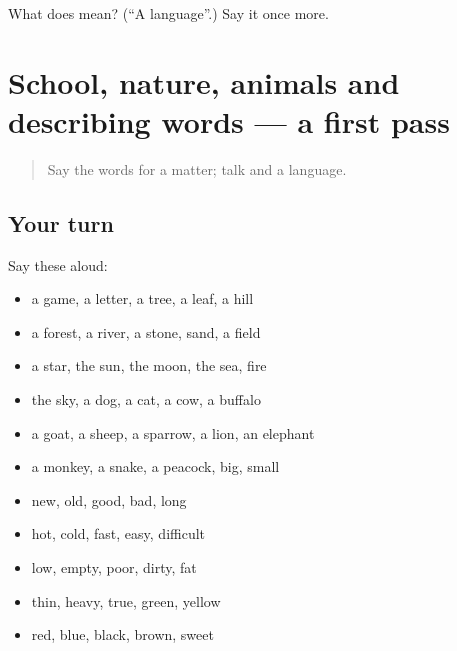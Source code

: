 \begin{tcolorbox}[breakable,colback=teal!4,colframe=teal!35!black,title={Before you move on}]
What does  mean? (\textquotedblleft{}A language\textquotedblright{}.) Say it once more.
\end{tcolorbox}
\section[(dialogue)]{School, nature, animals and describing words — a first pass}

\label{lesson:MW-R89-first-pass-school-nature-animals-and-describing-wor}



\begin{quote}
Say the words for a matter; talk and a language.
\end{quote}

\subsection*{Your turn}
Say these aloud:

\begin{itemize}
\raggedright
  \item a game, a letter, a tree, a leaf, a hill
  \item a forest, a river, a stone, sand, a field
  \item a star, the sun, the moon, the sea, fire
  \item the sky, a dog, a cat, a cow, a buffalo
  \item a goat, a sheep, a sparrow, a lion, an elephant
  \item a monkey, a snake, a peacock, big, small
  \item new, old, good, bad, long
  \item hot, cold, fast, easy, difficult
  \item low, empty, poor, dirty, fat
  \item thin, heavy, true, green, yellow
  \item red, blue, black, brown, sweet
\end{itemize}

